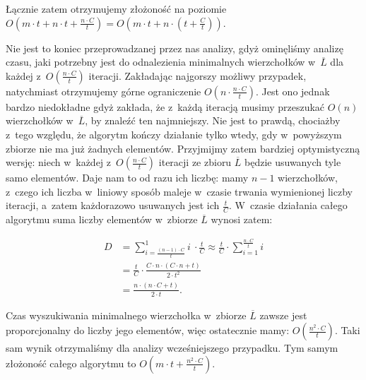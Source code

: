 Łącznie zatem otrzymujemy złożoność na poziomie $O \left( m \cdot t + n \cdot t + \frac{n \cdot C}{t} \right) = O \left( m \cdot t + n \cdot \left( t + \frac{C}{t}\right) \right)$.

Nie jest to koniec przeprowadzanej przez nas analizy, gdyż ominęliśmy analizę czasu, jaki potrzebny jest do odnalezienia minimalnych wierzchołków w~$\overline{L}$ dla każdej z~$O \left( \frac{n \cdot C}{t}\right)$ iteracji.
Zakładając najgorszy możliwy przypadek, natychmiast otrzymujemy górne ograniczenie $O \left( n \cdot \frac{n \cdot C}{t} \right)$.
Jest ono jednak bardzo niedokładne gdyż zakłada, że z~każdą iteracją musimy przeszukać $O \left( n \right)$ wierzchołków w~$\overline{L}$, by znaleźć ten najmniejszy.
Nie jest to prawdą, chociażby z~tego względu, że algorytm kończy działanie tylko wtedy, gdy w~powyższym zbiorze nie ma już żadnych elementów.
Przyjmijmy zatem bardziej optymistyczną wersję: niech w~każdej z~$O \left( \frac{n \cdot C}{t}\right)$ iteracji ze zbioru $\overline{L}$ będzie usuwanych tyle samo elementów.
Daje nam to od razu ich liczbę: mamy $n-1$ wierzchołków, z~czego ich liczba w~liniowy sposób maleje w~czasie trwania wymienionej liczby iteracji, a~zatem każdorazowo usuwanych jest ich $\frac{t}{C}$.
W~czasie działania całego algorytmu suma liczby elementów w~zbiorze $\overline{L}$ wynosi zatem:

\begin{equation}
	\begin{aligned}
		D &= \sum_{i=\frac{ \left( n-1 \right) \cdot C}{t}}^{1} i~\cdot \frac{t}{C} \approx \frac{t}{C} \cdot \sum_{i=1}^{\frac{n \cdot C}{t}} i\\
		&= \frac{t}{C} \cdot \frac{C \cdot n \cdot \left( C \cdot n + t \right)}{2 \cdot t^{2}} \\
		&= \frac{n \cdot \left( n \cdot C + t \right)}{2 \cdot t}.
	\end{aligned}
\end{equation}

Czas wyszukiwania minimalnego wierzchołka w~zbiorze $\overline{L}$ zawsze jest proporcjonalny do liczby jego elementów, więc ostatecznie mamy: $O \left( \frac{n^{2} \cdot C}{t}\right)$.
Taki sam wynik otrzymaliśmy dla analizy wcześniejszego przypadku.
Tym samym złożoność całego algorytmu to $O \left( m \cdot t + \frac{n^{2} \cdot C}{t}\right)$.

